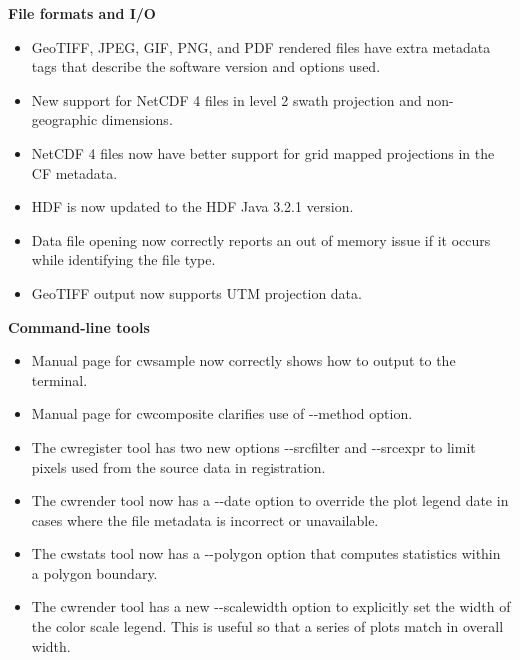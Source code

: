 \hspace{0.4cm} {\bf File formats and I/O}

\begin{itemize}

  \item GeoTIFF, JPEG, GIF, PNG, and PDF rendered files have extra metadata tags
  that describe the software version and options used.

  \item New support for NetCDF 4 files in level 2 swath projection and
  non-geographic dimensions.

  \item NetCDF 4 files now have better support for grid mapped projections in
  the CF metadata.

  \item HDF is now updated to the HDF Java 3.2.1 version.

  \item Data file opening now correctly reports an out of memory issue if it
  occurs while identifying the file type.

  \item GeoTIFF output now supports UTM projection data.

\end{itemize}

\hspace{0.4cm} {\bf Command-line tools}

\begin{itemize}

  \item Manual page for cwsample now correctly shows how to output to the
  terminal.

  \item Manual page for cwcomposite clarifies use of -{-}method option.

  \item The cwregister tool has two new options -{-}srcfilter and -{-}srcexpr
  to limit pixels used from the source data in registration.

  \item The cwrender tool now has a -{-}date option to override the plot legend
  date in cases where the file metadata is incorrect or unavailable.

  \item The cwstats tool now has a -{-}polygon option that computes statistics
  within a polygon boundary.

  \item The cwrender tool has a new -{-}scalewidth option to explicitly set the
  width of the color scale legend.  This is useful so that a series of plots
  match in overall width.

\end{itemize}

